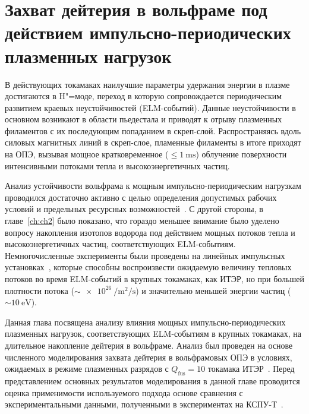 \chapter{Захват дейтерия в вольфраме под действием импульсно-периодических плазменных нагрузок}\label{ch:ch3}

В действующих токамаках наилучшие параметры удержания энергии в плазме достигаются в H"=моде, переход в которую сопровождается периодическим развитием краевых неустойчивостей (ELM-событий). Данные неустойчивости в основном возникают в области пьедестала и приводят к отрыву плазменных филаментов с их последующим попаданием в скреп-слой. Распространяясь вдоль силовых магнитных линий в скреп-слое, пламенные филаменты в итоге приходят на ОПЭ, вызывая мощное кратковременное (\( \leq \SI{1}{\milli\second} \)) облучение поверхности интенсивными потоками тепла и высокоэнергетичных частиц.

Анализ устойчивости вольфрама к мощным импульсно-периодическим нагрузкам проводился достаточно активно с целью определения допустимых рабочих условий и предельных ресурсных возможностей~\cite{Pintsuk2012,Budaev2015,Rieth2019}. С другой стороны, в главе~\cref{ch:ch2} было показано, что гораздо меньшее внимание было уделено вопросу накопления изотопов водорода под действием мощных потоков тепла и высокоэнергетичных частиц, соответствующих ELM-событиям. Немногочисленные эксперименты были проведены на линейных импульсных установках~\cite{Poskakalov2020,Ogorodnikova,Nishijima2011}, которые способны воспроизвести ожидаемую величину тепловых потоков во время ELM-событий в крупных токамаках, как ИТЭР, но при большей плотности потока (\(\sim\SI{e26}{\per\meter\squared\per\second}\)) и значительно меньшей энергии частиц (\(\sim\SI{10}{\electronvolt}\)). 

Данная глава посвящена анализу влияния мощных импульсно-периодических плазменных нагрузок, соответствующих ELM-событиям в крупных токамаках, на длительное накопление дейтерия в вольфраме. Анализ был проведен на основе численного моделирования захвата дейтерия в вольфрамовых ОПЭ в условиях, ожидаемых в режиме плазменных разрядов с \(Q_\mathrm{fus}=\num{10}\) токамака ИТЭР~\cite{Kulagin2025_JNM}. Перед представлением основных результатов моделирования в данной главе проводится оценка применимости используемого подхода основе сравнения с экспериментальными данными, полученными в экспериментах на КСПУ-Т~\cite{Poskakalov2020}. 

